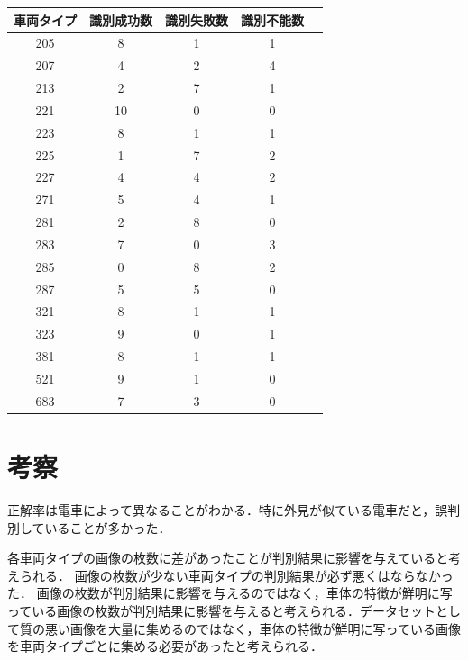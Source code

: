 \begin{multicols*}{2}
\begin{table} %
	\centering
		\begin{tabular}{ccccc}
			\hline
			車両タイプ&識別成功数&識別失敗数&識別不能数 \\
			\hline
			205 & 8 & 1 & 1 \\
			207 & 4 & 2 & 4 \\
			213 & 2 & 7 & 1 \\
			221 & 10 & 0 & 0 \\
			223 & 8 & 1 & 1 \\
			225 & 1 & 7 & 2 \\
			227 & 4 & 4 & 2 \\
			271 & 5 & 4 & 1 \\
			281 & 2 & 8 & 0 \\
			283 & 7 & 0 & 3 \\
			285 & 0 & 8 & 2 \\
			287 & 5 & 5 & 0 \\
			321 & 8 & 1 & 1 \\
			323 & 9 & 0 & 1 \\
			381 & 8 & 1 & 1 \\
			521 & 9 & 1 & 0 \\
			683 & 7 & 3 & 0 \\
		\end{tabular}
\end{table}




\section{考察}
正解率は電車によって異なることがわかる．特に外見が似ている電車だと，誤判別していることが多かった．%

各車両タイプの画像の枚数に差があったことが判別結果に影響を与えていると考えられる．
画像の枚数が少ない車両タイプの判別結果が必ず悪くはならなかった．
画像の枚数が判別結果に影響を与えるのではなく，車体の特徴が鮮明に写っている画像の枚数が判別結果に影響を与えると考えられる．データセットとして質の悪い画像を大量に集めるのではなく，車体の特徴が鮮明に写っている画像を車両タイプごとに集める必要があったと考えられる．



\end{multicols*}
